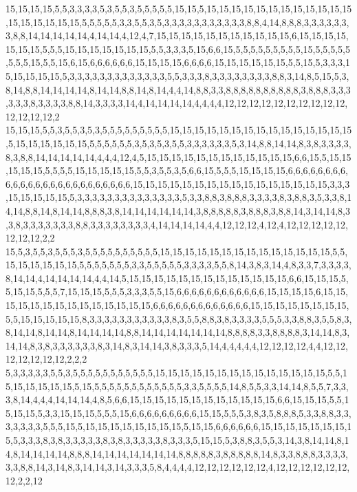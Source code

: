 15,15,15,15,5,5,3,3,3,3,5,3,5,5,3,5,5,5,5,5,15,15,5,15,15,15,15,15,15,15,15,15,15,15,15,15,15,15,15,15,15,5,5,5,5,5,3,3,5,5,3,5,3,3,3,3,3,3,3,3,3,3,3,8,8,4,14,8,8,8,3,3,3,3,3,3,3,8,8,14,14,14,14,14,4,14,14,4,12,4,7,15,15,15,15,15,15,15,15,15,15,15,6,15,15,15,15,15,15,15,5,5,5,15,15,15,15,15,15,15,5,5,3,3,3,5,15,6,6,15,5,5,5,5,5,5,5,5,5,15,5,5,5,5,5,5,5,5,15,5,5,15,6,15,6,6,6,6,6,6,15,15,15,15,6,6,6,6,15,15,15,15,15,15,5,5,15,5,3,3,3,15,15,15,15,15,5,3,3,3,3,3,3,3,3,3,3,3,3,3,5,5,3,3,3,8,3,3,3,3,3,3,3,3,8,8,3,14,8,5,15,5,3,8,14,8,8,14,14,14,14,8,14,14,8,8,14,8,14,4,4,14,8,8,3,3,8,8,8,8,8,8,8,8,8,8,3,8,8,8,3,3,3,3,3,3,8,3,3,3,3,8,8,14,3,3,3,3,14,4,14,14,14,14,4,4,4,4,12,12,12,12,12,12,12,12,12,12,12,12,12,12,2
15,15,15,5,5,3,5,5,3,5,3,5,5,5,5,5,5,5,5,5,15,15,15,15,15,15,15,15,15,15,15,15,15,15,15,5,15,15,15,15,15,15,5,5,5,5,5,5,3,5,3,5,3,5,5,3,3,3,3,3,3,5,3,14,8,8,14,14,8,3,8,3,3,3,3,8,3,8,8,14,14,14,14,14,4,4,4,12,4,5,15,15,15,15,15,15,15,15,15,15,15,15,6,6,15,5,15,15,15,15,15,5,5,5,5,15,15,15,15,15,5,5,3,5,5,3,5,6,6,15,5,5,5,15,15,15,15,6,6,6,6,6,6,6,6,6,6,6,6,6,6,6,6,6,6,6,6,6,6,6,6,6,15,15,15,15,15,15,15,15,15,15,15,15,15,15,15,15,3,3,3,15,15,15,15,15,5,3,3,3,3,3,3,3,3,3,3,3,3,3,3,5,3,3,8,8,3,8,8,8,3,3,3,3,8,3,8,8,3,5,3,3,8,14,14,8,8,14,8,14,14,8,8,8,3,8,14,14,14,14,14,14,3,8,8,8,8,8,3,8,8,8,3,8,8,14,3,14,14,8,3,3,8,3,3,3,3,3,3,3,8,8,3,3,3,3,3,3,3,3,4,14,14,14,14,4,4,12,12,12,4,12,4,12,12,12,12,12,12,12,12,2,2
15,5,3,5,5,3,5,5,5,3,5,5,5,5,5,5,5,5,5,5,15,15,15,15,15,15,15,15,15,15,15,15,15,15,5,5,15,15,15,15,15,15,5,5,5,5,5,5,5,3,3,5,5,5,5,5,3,3,3,3,5,5,8,14,3,8,3,14,4,8,3,3,7,3,3,3,3,8,14,14,4,14,14,14,14,4,4,14,5,15,15,15,15,15,15,15,15,15,15,15,15,15,6,6,15,15,15,5,5,15,15,5,5,5,7,15,15,15,5,5,5,3,3,3,5,5,15,6,6,6,6,6,6,6,6,6,6,6,6,15,15,15,15,6,15,15,15,15,15,15,15,15,15,15,15,15,15,15,6,6,6,6,6,6,6,6,6,6,6,6,6,15,15,15,15,15,15,15,15,5,5,15,15,15,15,15,8,3,3,3,3,3,3,3,3,3,3,3,8,3,5,5,8,8,3,8,3,3,3,3,5,5,5,3,3,8,8,3,5,5,8,3,8,14,14,8,14,14,8,14,14,14,14,8,8,14,14,14,14,14,14,14,8,8,8,8,3,3,8,8,8,8,3,14,14,8,3,14,14,8,3,8,3,3,3,3,3,3,8,3,14,8,3,14,14,3,8,3,3,3,5,14,4,4,4,4,4,12,12,12,12,4,4,12,12,12,12,12,12,12,2,2,2
5,3,3,3,3,3,5,5,3,5,5,5,5,5,5,5,5,5,5,5,15,15,15,15,15,15,15,15,15,15,15,15,15,15,5,5,15,15,15,15,15,15,5,15,5,5,5,5,5,5,5,5,5,5,5,5,3,3,5,5,5,5,14,8,5,5,3,3,14,14,8,5,5,7,3,3,3,8,14,4,4,4,14,14,14,4,8,5,6,6,15,15,15,15,15,15,15,15,15,15,15,15,6,6,15,15,15,5,5,15,15,15,5,3,3,15,15,15,5,5,5,15,6,6,6,6,6,6,6,6,6,15,15,5,5,5,3,8,3,5,8,8,8,5,3,3,8,8,3,3,3,3,3,3,3,5,5,5,15,5,15,15,15,15,15,15,15,15,5,15,15,6,6,6,6,6,6,15,15,15,15,15,15,15,15,5,3,3,3,8,3,8,3,3,3,3,3,8,3,8,3,3,3,3,3,8,3,3,3,5,15,15,5,3,8,8,3,5,5,3,14,3,8,14,14,8,14,8,14,14,14,14,8,8,8,14,14,14,14,14,14,14,8,8,8,8,8,3,8,8,8,8,8,14,8,3,3,8,8,8,3,3,3,3,3,3,8,8,14,3,14,8,3,14,14,3,14,3,3,3,5,8,4,4,4,4,12,12,12,12,12,12,4,12,12,12,12,12,12,12,2,2,12
